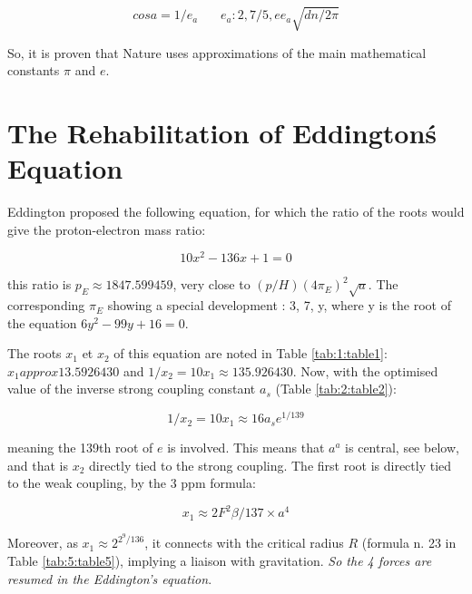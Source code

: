 \documentclass[a4paper,9pt]{article}
\begin{document}
\begin{equation}
cosa = 1/e_a ~~~~~~~~  e_a : 2, 7/5, ee_a \sqrt{dn/2\pi} 
\end{equation}

So, it is proven that Nature uses approximations of the main mathematical constants $\pi$ and $e$.








\section{The Rehabilitation of Eddington\'s Equation}
Eddington proposed the following equation, for which the ratio of the roots would give the proton-electron mass ratio:

\begin{equation}
 10x^2 - 136x +1 = 0     
\end{equation}

this ratio is $p_E \approx 1847.599459$, very close to $(p/H)(4\pi_E)^2\sqrt a$. The corresponding $\pi_E$ showing a special development : 3, 7, y, where y is the root of the equation $6y^2 - 99 y + 16 = 0$. 

The roots $x_1$ et $x_2$ of this equation are noted in Table \ref{tab:1:table1}: $x_1 approx 13.5926430$ and $1/x_2 = 10 x_1 \approx  135.926430$. Now, with the optimised value of the inverse strong coupling constant $a_s$ (Table \ref{tab:2:table2}):

\begin{equation}
 1/x_2 = 10 x_1 \approx 16 a_s e^{1/139}     
\end{equation}

meaning the 139th root of $e$ is involved. This means that $a^a$ is central, see below, and that is $x_2$ directly tied to the strong coupling. The first root is directly tied to the weak coupling, by the 3 ppm formula:

\begin{equation}
  x_1 \approx 2F^2 \beta /137\times a^4    
\end{equation}

Moreover, as $x_1 \approx 2^{2^9/136}$, it connects with the critical radius $R$ (formula n. 23 in Table \ref{tab:5:table5}), implying a liaison with gravitation. \textit{So the 4 forces are resumed in the Eddington's equation}.
\end{document}
